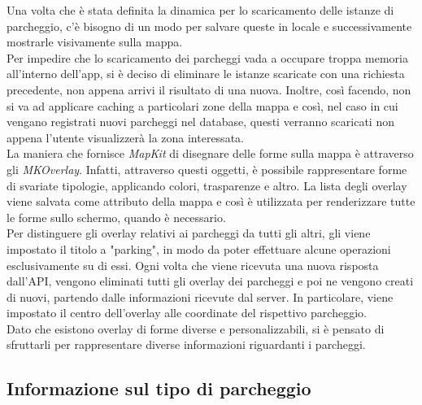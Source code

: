 Una volta che è stata definita la dinamica per lo scaricamento delle istanze di 
parcheggio, c'è bisogno di un modo per salvare queste in locale e successivamente 
mostrarle visivamente sulla mappa.\\
Per impedire che lo scaricamento dei parcheggi vada a occupare troppa memoria 
all'interno dell'app, si è deciso di eliminare le istanze scaricate con una 
richiesta precedente, non appena arrivi il risultato di una nuova. Inoltre, 
così facendo, non si va ad applicare caching a particolari zone della mappa
e così, nel caso in cui vengano registrati nuovi parcheggi nel database, questi 
verranno scaricati non appena l'utente visualizzerà la zona interessata.\\
La maniera che fornisce \emph{MapKit} di disegnare delle forme sulla mappa è 
attraverso gli \emph{MKOverlay}. Infatti, attraverso questi oggetti, è possibile
rappresentare forme di svariate tipologie, applicando colori, trasparenze e altro.
La lista degli overlay viene salvata come attributo della mappa e così 
è utilizzata per renderizzare tutte le forme sullo schermo, quando è necessario.\\
Per distinguere gli overlay relativi ai parcheggi da tutti gli altri, gli 
viene impostato il titolo a "parking", in modo da poter effettuare alcune operazioni 
esclusivamente su di essi. Ogni volta che viene ricevuta una nuova risposta dall'API, 
vengono eliminati tutti gli overlay dei parcheggi e poi ne vengono creati 
di nuovi, partendo dalle informazioni ricevute dal server. In particolare, viene 
impostato il centro dell'overlay alle coordinate del rispettivo parcheggio.\\
Dato che esistono overlay di forme diverse e personalizzabili, si è pensato di 
sfruttarli per rappresentare diverse informazioni riguardanti i parcheggi.

\subsection{Informazione sul tipo di parcheggio} 

